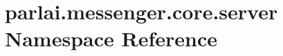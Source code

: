 \hypertarget{namespaceparlai_1_1messenger_1_1core_1_1server}{}\section{parlai.\+messenger.\+core.\+server Namespace Reference}
\label{namespaceparlai_1_1messenger_1_1core_1_1server}
